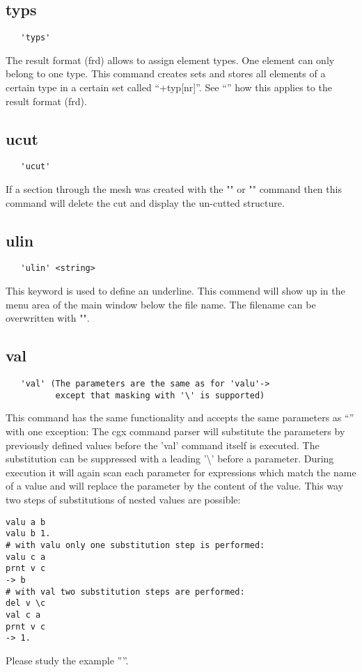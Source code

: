 \documentclass{article}
\begin{document}
\subsection{\label{typs}typs}
\begin{verbatim}
   'typs'
\end{verbatim}
The result format (frd) allows to assign element types. One element can only belong to one type. This command creates sets and stores all elements of a certain type in a certain set called ``+typ[nr]''. See ``'' how this applies to the result format (frd).

\subsection{\label{ucut}ucut}
\begin{verbatim}
   'ucut'
\end{verbatim}
If a section through the mesh was created with the "" or "" command then this command will delete the cut and display the un-cutted structure.

\subsection{\label{ulin}ulin}
\begin{verbatim}
   'ulin' <string> 
\end{verbatim}
This keyword is used to define an underline. This commend will show up in the
menu area of the main window below the file name. The filename can be overwritten with "".

\subsection{\label{val}val}
\begin{verbatim}
   'val' (The parameters are the same as for 'valu'->
          except that masking with '\' is supported)
\end{verbatim}
This command has the same functionality and accepts the same parameters as ``'' with one exception: The cgx command parser will substitute the parameters by previously defined values before the 'val' command itself is executed. The substitution can be suppressed with a leading '\textbackslash{}' before a parameter. During execution it will again scan each parameter for expressions which match the name of a value and will replace the parameter by the content of the value. This way two steps of substitutions of nested values are possible:
\begin{verbatim}
valu a b
valu b 1.
# with valu only one substitution step is performed:
valu c a
prnt v c
-> b
# with val two substitution steps are performed:
del v \c
val c a
prnt v c
-> 1.
\end{verbatim}
Please study the example ''''.
\end{document}
